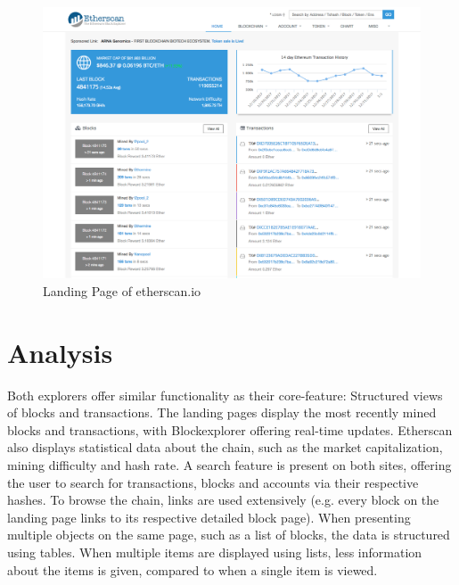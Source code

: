 \begin{figure}
  \includegraphics[width=\linewidth]{etherscan.png}
  \caption{Landing Page of etherscan.io \cite{etherscan}}
  \label{fig:etherscan1}
\end{figure}

\section{Analysis} \label{analysis}
Both explorers offer similar functionality as their core-feature: Structured views of blocks and transactions. The landing pages display the most recently mined blocks and transactions, with Blockexplorer offering real-time updates. Etherscan also displays statistical data about the chain, such as the market capitalization, mining difficulty and hash rate. A search feature is present on both sites, offering the user to search for transactions, blocks and accounts via their respective hashes. To browse the chain, links are used extensively (e.g. every block on the landing page links to its respective detailed block page). When presenting multiple objects on the same page, such as a list of blocks, the data is structured using tables. When multiple items are displayed using lists, less information about the items is given, compared to when a single item is viewed.

